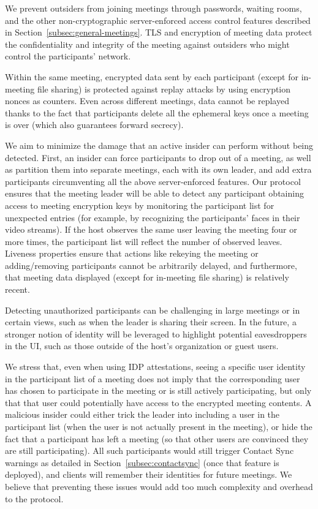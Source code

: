 We prevent outsiders from joining meetings through passwords, waiting rooms, and the other
non-cryptographic server-enforced access control features described in
Section~\ref{subsec:general-meetings}. TLS and encryption of meeting data protect the
confidentiality and integrity of the meeting against outsiders who might control the participants'
network.

Within the same meeting, encrypted data sent by each participant (except for in-meeting file
sharing) is protected against replay attacks by using encryption nonces as counters. Even across
different meetings, data cannot be replayed thanks to the fact that participants delete all the
ephemeral keys once a meeting is over (which also guarantees forward secrecy).

We aim to minimize the damage that an active insider can perform without being detected. First, an
insider can force participants to drop out of a meeting, as well as partition them into separate
meetings, each with its own leader, and add extra participants circumventing all the above
server-enforced features. Our protocol ensures that the meeting leader will be able to detect any
participant obtaining access to meeting encryption keys by monitoring the participant list for
unexpected entries (for example, by recognizing the participants' faces in their video streams). If
the host observes the same user leaving the meeting four or more times, the participant list will
reflect the number of observed leaves. Liveness properties ensure that actions like rekeying the
meeting or adding/removing participants cannot be arbitrarily delayed, and furthermore, that meeting
data displayed (except for in-meeting file sharing) is relatively recent.

Detecting unauthorized participants can be challenging in large meetings or in certain views, such
as when the leader is sharing their screen. In the future, a stronger notion of identity will be
leveraged to highlight potential eavesdroppers in the UI, such as those outside of the host's
organization or guest users.

We stress that, even when using IDP attestations, seeing a specific user identity in the participant
list of a meeting does not imply that the corresponding user has chosen to participate in the
meeting or is still actively participating, but only that that user could potentially have access to
the encrypted meeting contents. A malicious insider could either trick the leader into including a
user in the participant list (when the user is not actually present in the meeting), or hide the
fact that a participant has left a meeting (so that other users are convinced they are still
participating). All such participants would still trigger Contact Sync warnings as detailed in
Section~\ref{subsec:contactsync} (once that feature is deployed), and clients will remember their
identities for future meetings. We believe that preventing these issues would add too much
complexity and overhead to the protocol.

